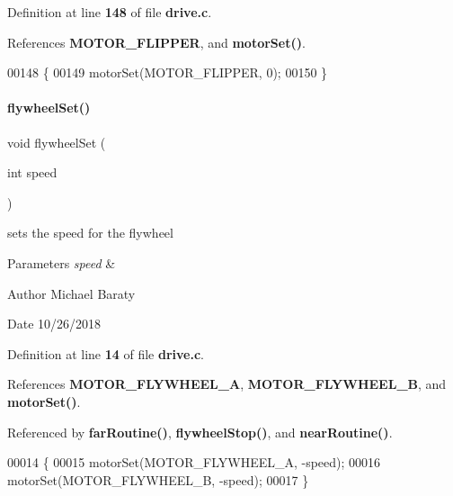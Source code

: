 Definition at line \textbf{ 148} of file \textbf{ drive.\+c}.



References \textbf{ M\+O\+T\+O\+R\+\_\+\+F\+L\+I\+P\+P\+ER}, and \textbf{ motor\+Set()}.


\begin{DoxyCode}
00148                    \{
00149   motorSet(MOTOR_FLIPPER, 0);
00150 \}
\end{DoxyCode}
\mbox{\label{drive_8h_a60e483906879d9558762282b5d5b581b}} 
\paragraph{flywheel\+Set()}
{\footnotesize\ttfamily void flywheel\+Set (\begin{DoxyParamCaption}\item[{int}]{speed }\end{DoxyParamCaption})}



sets the speed for the flywheel 


\begin{DoxyParams}{Parameters}
{\em speed} & \\
\hline
\end{DoxyParams}
\begin{DoxyAuthor}{Author}
Michael Baraty 
\end{DoxyAuthor}
\begin{DoxyDate}{Date}
10/26/2018 
\end{DoxyDate}


Definition at line \textbf{ 14} of file \textbf{ drive.\+c}.



References \textbf{ M\+O\+T\+O\+R\+\_\+\+F\+L\+Y\+W\+H\+E\+E\+L\+\_\+A}, \textbf{ M\+O\+T\+O\+R\+\_\+\+F\+L\+Y\+W\+H\+E\+E\+L\+\_\+B}, and \textbf{ motor\+Set()}.



Referenced by \textbf{ far\+Routine()}, \textbf{ flywheel\+Stop()}, and \textbf{ near\+Routine()}.


\begin{DoxyCode}
00014                             \{
00015   motorSet(MOTOR_FLYWHEEL_A, -speed);
00016   motorSet(MOTOR_FLYWHEEL_B, -speed);
00017 \}
\end{DoxyCode}
\mbox{\label{drive_8h_a6889fbcc0c9811401a9339e1bafbf467}} 

